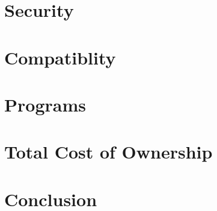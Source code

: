 \documentclass[a4paper,12pt]{article}
\begin{document}
\section*{Security}

\section*{Compatiblity}

\section*{Programs}

\section*{Total Cost of Ownership}

\section*{Conclusion}
\end{document}
